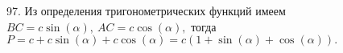 97. Из определения тригонометрических функций имеем $BC=c\sin(\alpha),\ AC=c\cos(\alpha),$ тогда $P=c+c\sin(\alpha)+c\cos(\alpha)=c(1+\sin(\alpha)+\cos(\alpha)).$\\
